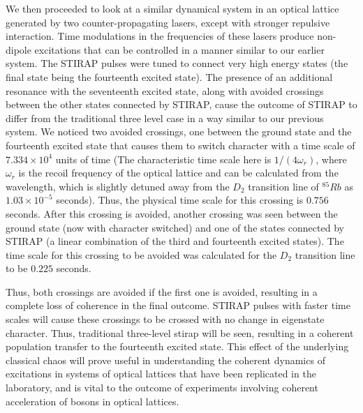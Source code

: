 We then proceeded to look at a similar dynamical system in an optical lattice generated by two counter-propagating lasers, except with stronger repulsive interaction. Time modulations in the frequencies of these lasers produce non-dipole excitations that can be controlled in a manner similar to our earlier system. The STIRAP pulses were tuned to connect very high energy states (the final state being the fourteenth excited state). The presence of an additional resonance with the seventeenth excited state, along with avoided crossings between the other states connected by STIRAP, cause the outcome of STIRAP to differ from the traditional three level case in a way similar to our previous system. We noticed two avoided crossings, one between the ground state and the fourteenth excited state that causes them to switch character with a time scale of $7.334 \times 10^4$ units of time (The characteristic time scale here is $1/(4\omega_r)$, where $\omega_r$ is the recoil frequency of the optical lattice and can be calculated from the wavelength, which is slightly detuned away from the $D_2$ transition line of $^{85}Rb$ as $1.03 \times 10^{-5}$ seconds). Thus, the physical time scale for this crossing is $0.756$ seconds. After this crossing is avoided, another crossing was seen between the ground state (now with character switched) and one of the states connected by STIRAP (a linear combination of the third and fourteenth excited states). The time scale for this crossing to be avoided was calculated for the $D_2$ transition line to be $0.225$ seconds. 

Thus, both crossings are avoided if the first one is avoided, resulting in a complete loss of coherence in the final outcome. STIRAP pulses with faster time scales will cause these crossings to be crossed with no change in eigenstate character. Thus, traditional three-level stirap will be seen, resulting in a  coherent population transfer to the fourteenth excited state. This effect of the underlying classical chaos will prove useful in understanding the coherent dynamics of excitations in systems of optical lattices that have been replicated in the laboratory, and is vital to the outcome of experiments involving coherent acceleration of bosons in optical lattices.